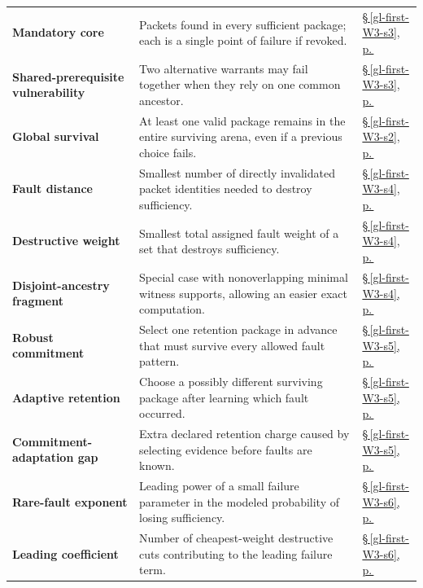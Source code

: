 \documentclass[11pt,letterpaper]{article}
\begin{document}
\begin{longtable}{@{}>{\raggedright\arraybackslash}p{.215\linewidth}>{\raggedright\arraybackslash}p{.585\linewidth}>{\raggedright\arraybackslash}p{.14\linewidth}@{}}
\textbf{Mandatory core} & Packets found in every sufficient package; each is a single point of failure if revoked. & \hyperref[gl-first-W3-s3]{\S\,\ref*{gl-first-W3-s3}, p.\,\pageref*{gl-first-W3-s3}} \\
\textbf{Shared-prerequisite vulnerability} & Two alternative warrants may fail together when they rely on one common ancestor. & \hyperref[gl-first-W3-s3]{\S\,\ref*{gl-first-W3-s3}, p.\,\pageref*{gl-first-W3-s3}} \\
\textbf{Global survival} & At least one valid package remains in the entire surviving arena, even if a previous choice fails. & \hyperref[gl-first-W3-s2]{\S\,\ref*{gl-first-W3-s2}, p.\,\pageref*{gl-first-W3-s2}} \\
\textbf{Fault distance} & Smallest number of directly invalidated packet identities needed to destroy sufficiency. & \hyperref[gl-first-W3-s4]{\S\,\ref*{gl-first-W3-s4}, p.\,\pageref*{gl-first-W3-s4}} \\
\textbf{Destructive weight} & Smallest total assigned fault weight of a set that destroys sufficiency. & \hyperref[gl-first-W3-s4]{\S\,\ref*{gl-first-W3-s4}, p.\,\pageref*{gl-first-W3-s4}} \\
\textbf{Disjoint-ancestry fragment} & Special case with nonoverlapping minimal witness supports, allowing an easier exact computation. & \hyperref[gl-first-W3-s4]{\S\,\ref*{gl-first-W3-s4}, p.\,\pageref*{gl-first-W3-s4}} \\
\textbf{Robust commitment} & Select one retention package in advance that must survive every allowed fault pattern. & \hyperref[gl-first-W3-s5]{\S\,\ref*{gl-first-W3-s5}, p.\,\pageref*{gl-first-W3-s5}} \\
\textbf{Adaptive retention} & Choose a possibly different surviving package after learning which fault occurred. & \hyperref[gl-first-W3-s5]{\S\,\ref*{gl-first-W3-s5}, p.\,\pageref*{gl-first-W3-s5}} \\
\textbf{Commitment-adaptation gap} & Extra declared retention charge caused by selecting evidence before faults are known. & \hyperref[gl-first-W3-s5]{\S\,\ref*{gl-first-W3-s5}, p.\,\pageref*{gl-first-W3-s5}} \\
\textbf{Rare-fault exponent} & Leading power of a small failure parameter in the modeled probability of losing sufficiency. & \hyperref[gl-first-W3-s6]{\S\,\ref*{gl-first-W3-s6}, p.\,\pageref*{gl-first-W3-s6}} \\
\textbf{Leading coefficient} & Number of cheapest-weight destructive cuts contributing to the leading failure term. & \hyperref[gl-first-W3-s6]{\S\,\ref*{gl-first-W3-s6}, p.\,\pageref*{gl-first-W3-s6}} \\
\end{longtable}\endgroup
\end{document}
